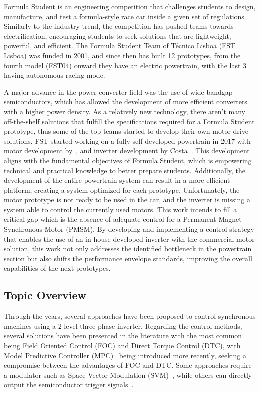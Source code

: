 \documentclass[9pt,conference]{IEEEtran}
\begin{document}
Formula Student is an engineering competition that challenges students to design, manufacture, and test a formula-style race car inside a given set of regulations. Similarly to the industry trend, the competition has pushed teams towards electrification, encouraging students to seek solutions that are lightweight, powerful, and efficient. The Formula Student Team of Técnico Lisboa (FST Lisboa) was funded in 2001, and since then has built 12 prototypes, from the fourth model (FST04) onward they have an electric powertrain, with the last 3 having autonomous racing mode.

A major advance in the power converter field was the use of wide bandgap semiconductors, which has allowed the development of more efficient converters with a higher power density. As a relatively new technology, there aren't many off-the-shelf solutions that fulfill the specifications required for a Formula Student prototype, thus some of the top teams started to develop their own motor drive solutions\@. FST started working on a fully self-developed powertrain in 2017 with motor development by~\citet{Sarrico:MSc}, and inverter development by Costa~\cite{Costa:MSc}. This development aligns with the fundamental objectives of Formula Student, which is empowering technical and practical knowledge to better prepare students. Additionally, the development of the entire powertrain system can result in a more efficient platform, creating a system optimized for each prototype. Unfortunately, the motor prototype is not ready to be used in the car, and the inverter is missing a system able to control the currently used motors. This work intends to fill a critical gap which is the absence of adequate control for a Permanent Magnet Synchronous Motor (PMSM). By developing and implementing a control strategy that enables the use of an in-house developed inverter with the commercial motor solution, this work not only addresses the identified bottleneck in the powertrain section but also shifts the performance envelope standards, improving the overall capabilities of the next prototypes.
\subsection{Topic Overview}
Through the years, several approaches have been proposed to control synchronous machines using a 2-level three-phase inverter. Regarding the control methods, several solutions have been presented in the literature with the most common being Field Oriented Control (FOC) and Direct Torque Control (DTC), with Model Predictive Controller (MPC)~\cite{Bianchi:control_review} being introduced more recently, seeking a compromise between the advantages of FOC and DTC. Some approaches require a modulator such as Space Vector Modulation (SVM)~\cite{Neacsu:SVM_intro:2001:IECON}, while others can directly output the semiconductor trigger signals~\cite{Vazquez:MPC_in_power_systems_review:2017:IEEE}.
\end{document}
